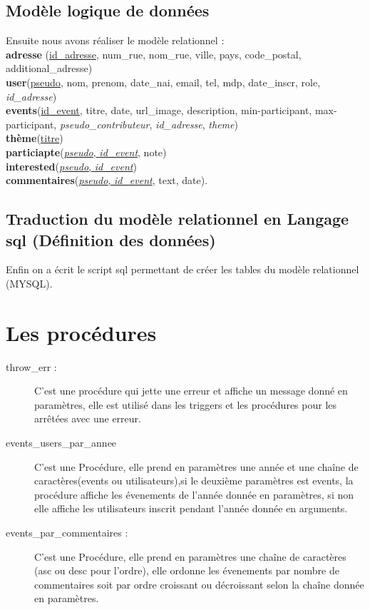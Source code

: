 \documentclass[oneside,11pt,a4paper]{article}
\begin{document}
\subsection{Modèle logique de données}
Ensuite nous avons réaliser le modèle relationnel : 
\\	
\textbf{adresse} (\underline{id\_adresse}, num\_rue, nom\_rue, ville, pays, code\_postal, additional\_adresse)\\
\textbf{user}(\underline{pseudo}, nom, prenom, date\_nai, email, tel, mdp, date\_inscr, role, \textit{id\_adresse})\\
\textbf{events}(\underline{id\_event}, titre, date, url\_image, description, min-participant, max-participant, \textit{pseudo\_contributeur}, \textit{id\_adresse}, \textit{theme})\\
\textbf{thème}(\underline{titre})\\
\textbf{particiapte}(\underline{\textit{pseudo}, \textit{id\_event}}, note)\\
\textbf{interested}(\underline{\textit{pseudo}, \textit{id\_event}})\\
\textbf{commentaires}(\underline{\textit{pseudo}, \textit{id\_event}}, text, date).\\

\subsection{Traduction du modèle relationnel en Langage sql (Définition des données)}
Enfin on a écrit le script sql permettant de créer les tables du modèle relationnel (MYSQL).
\section{Les procédures}
\begin{description}
	\item[ throw\_err : ] C'est une procédure qui jette une erreur et affiche  un message donné en paramètres, elle est utilisé dans les triggers et les procédures pour les arrêtées avec une erreur.
	 
	\item[events\_users\_par\_annee] C'est une Procédure, elle prend en paramètres une année et une chaîne de caractères(events ou utilisateurs),si le deuxième paramètres est events, la procédure affiche les évenements de l'année donnée en paramètres, si non elle affiche les utilisateurs inscrit pendant l'année donnée en arguments.
	\item[events\_par\_commentaires : ] C'est une Procédure, elle prend en paramètres une chaîne de caractères (asc ou desc pour l'ordre), elle ordonne les évenements par nombre de commentaires soit par ordre croissant ou décroissant selon la chaîne donnée en paramètres.
\end{description}
\end{document}
